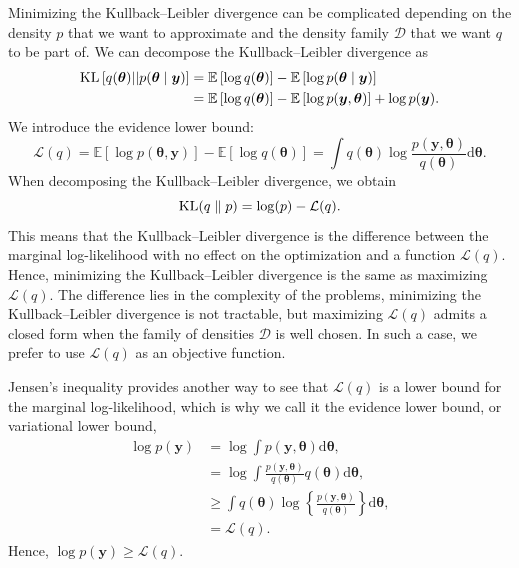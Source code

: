 \documentclass[a4paper, 11pt]{report}
\numberwithin{equation}{chapter}
\DeclareMathOperator*{\KL}{{\rm KL}}
\begin{document}
Minimizing the Kullback--Leibler divergence can be complicated depending on the density $p$ that we want to approximate and the density family $\mathcal{D}$ that we want $q$ to be part of. We can decompose the Kullback--Leibler divergence as
\begin{align*}
\KL\left[q(\boldsymbol{\theta})||p(\boldsymbol{\theta}\mid \boldsymbol{y})\right] &= \mathbb{E}\left[\log q(\boldsymbol{\theta})\right] - \mathbb{E}\left[\log p(\boldsymbol{\theta}\mid \boldsymbol{y})\right]\\
&= \mathbb{E}\left[\log q(\boldsymbol{\theta})\right] - \mathbb{E}\left[\log p(\boldsymbol{y},\boldsymbol{\theta})\right] + \log p(\boldsymbol{y}).
\end{align*}
We introduce the evidence lower bound:
\begin{equation*}
\mathcal{L}(q) = \mathbb{E}\left[\log p(\boldsymbol{\theta},\boldsymbol{y})\right] - \mathbb{E}\left[\log q(\boldsymbol{\theta})\right] =\int q(\boldsymbol{\theta})\log\frac{p(\boldsymbol{y},\boldsymbol{\theta})}{q(\boldsymbol{\theta})}\mathrm{d}\boldsymbol{\theta}.
\end{equation*}
When decomposing the Kullback--Leibler divergence, we obtain
\begin{equation*}
\KL(q\parallel p) = \log(p) - \mathcal{L}(q).
\end{equation*}
This means that the Kullback--Leibler divergence is the difference between the marginal log-likelihood with no effect on the optimization and a function $\mathcal{L}(q)$. Hence, minimizing the Kullback--Leibler divergence is the same as maximizing $\mathcal{L}(q)$. The difference lies in the complexity of the problems, minimizing the Kullback--Leibler divergence is not tractable, but maximizing $\mathcal{L}(q)$ admits a closed form when the family of densities $\mathcal{D}$ is well chosen. In such a case, we prefer to use $\mathcal{L}(q)$ as an objective function.

Jensen's inequality provides another way to see that $\mathcal{L}(q)$ is a lower bound for the marginal log-likelihood, which is why we call it the evidence lower bound, or variational lower bound,
\begin{align*}
\log p(\boldsymbol{y}) &= \log \int p(\boldsymbol{y}, \boldsymbol{\theta}) \mathrm{d}\boldsymbol{\theta},\\
&= \log \int \frac{p(\boldsymbol{y}, \boldsymbol{\theta})}{q(\boldsymbol{\theta})}q(\boldsymbol{\theta})\mathrm{d}\boldsymbol{\theta}
,\\
&\geq \int q(\boldsymbol{\theta}) \log \left\lbrace \frac{p(\boldsymbol{y}, \boldsymbol{\theta})}{q(\boldsymbol{\theta})} \right\rbrace \mathrm{d}\boldsymbol{\theta},\\
&= \mathcal{L}(q).
\end{align*}
Hence, $\log p(\boldsymbol{y}) \geq \mathcal{L}(q)$.
\end{document}
